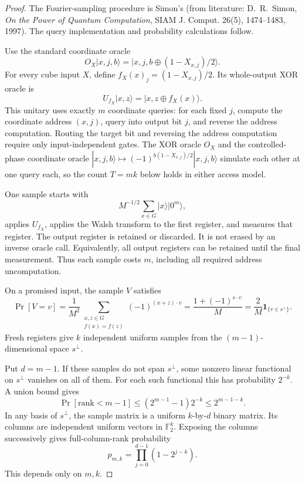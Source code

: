 \begin{proof}
The Fourier-sampling procedure is Simon's (from literature: D.~R.~Simon,
\emph{On the Power of Quantum Computation}, SIAM J. Comput. 26(5),
1474--1483, 1997). The query implementation and probability calculations follow.

Use the standard coordinate oracle
\[
 O_X|x,j,b\rangle
 =|x,j,b\oplus(1-X_{x,j})/2\rangle.
\]
For every cube input \(X\), define \(f_X(x)_j=(1-X_{x,j})/2\).
Its whole-output XOR oracle is
\[
 U_{f_X}|x,z\rangle=|x,z\oplus f_X(x)\rangle.
\]
This unitary uses exactly \(m\) coordinate queries: for each fixed \(j\), compute the coordinate address \((x,j)\), query into output bit \(j\), and reverse the address computation. Routing the target bit and reversing the address computation require only input-independent gates.
The XOR oracle \(O_X\) and the controlled-phase coordinate oracle
\(|x,j,b\rangle\mapsto(-1)^{b(1-X_{x,j})/2}|x,j,b\rangle\) simulate each other at one query each, so the count \(T=mk\) below holds in either access model.

One sample starts with
\[
 M^{-1/2}\sum_{x\in G}|x\rangle|0^m\rangle,
\]
applies \(U_{f_X}\), applies the Walsh transform to the first register, and measures that register. The output register is retained or discarded. It is not erased by an inverse oracle call. Equivalently, all output registers can be retained until the final measurement. Thus each sample costs \(m\), including all required address uncomputation.

On a promised input, the sample \(V\) satisfies
\[
 \Pr[V=v]
 =\frac1{M^2}
   \sum_{\substack{x,z\in G\\f(x)=f(z)}}
       (-1)^{(x+z)\cdot v}
 =\frac{1+(-1)^{s\cdot v}}M
 =\frac2M\mathbf1_{\{v\in s^\perp\}}.
\]
Fresh registers give \(k\) independent uniform samples from the
\((m-1)\)-dimensional space \(s^\perp\).

Put \(d=m-1\). If these samples do not span \(s^\perp\), some nonzero linear functional on \(s^\perp\) vanishes on all of them. For each such functional this has probability \(2^{-k}\). A union bound gives
\[
 \Pr[\text{rank}<m-1]
 \le(2^{m-1}-1)2^{-k}
 \le2^{m-1-k}.
\]
In any basis of \(s^\perp\), the sample matrix is a uniform \(k\)-by-\(d\) binary matrix. Its columns are independent uniform vectors in \(\mathbb F_2^k\). Exposing the columns successively gives full-column-rank probability
\[
 p_{m,k}=\prod_{j=0}^{d-1}(1-2^{j-k}).
\]
This depends only on \(m,k\).


\end{proof}
